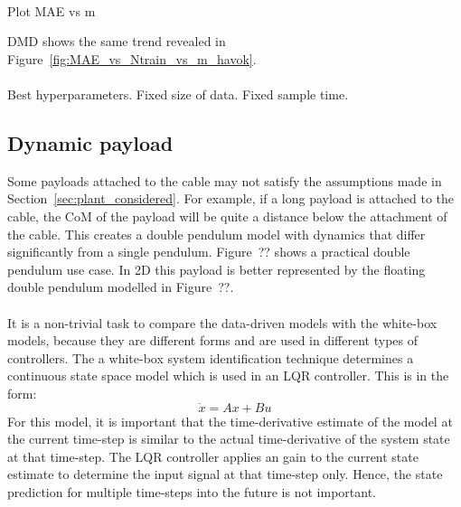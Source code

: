         \paragraph{}
        Plot MAE vs m
        
        DMD shows the same trend revealed in Figure~\ref{fig:MAE_vs_Ntrain_vs_m_havok}.

        \paragraph{}

        Best hyperparameters.
        Fixed size of data.
        Fixed sample time.

    \subsection{Dynamic payload}
        Some payloads attached to the cable may not satisfy the assumptions made in Section~\ref{sec:plant_considered}.
        For example, if a long payload is attached to the cable, the CoM of the payload will be quite a distance below the attachment of the cable.
        This creates a double pendulum model with dynamics that differ significantly from a single pendulum.
        Figure~?? shows a practical double pendulum use case. 
        In 2D this payload is better represented by the floating double pendulum modelled in Figure~??.

        
        \paragraph{}
        It is a non-trivial task to compare the data-driven models with the white-box models,
        because they are different forms and are used in different types of controllers.
        The a white-box system identification technique determines a continuous state space model 
        which is used in an LQR controller. 
        This is in the form:
        \begin{equation}
            \dot{x} = A x + B u
        \end{equation}
        For this model, it is important that the time-derivative estimate of the model 
        at the current time-step 
        is similar to the actual time-derivative of the system state at that time-step.
        The LQR controller applies an gain to the current state estimate 
        to determine the input signal at that time-step only.
        Hence, the state prediction for multiple time-steps into the future is not important.

